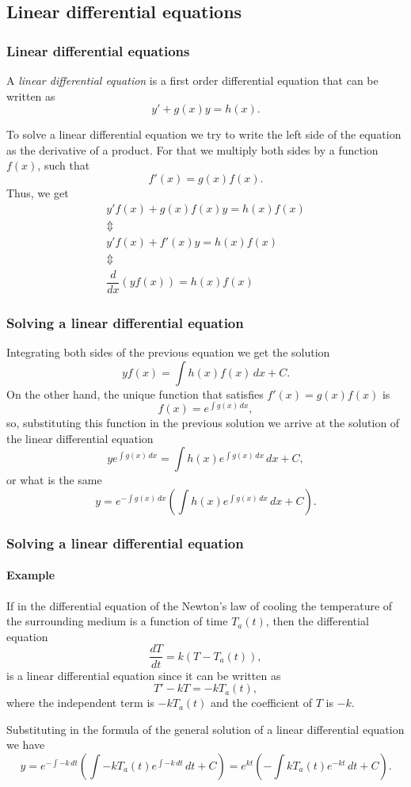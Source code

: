 \subsection{Linear differential equations}
\begin{frame}
\frametitle{Linear differential equations}
\begin{definition}
A \emph{linear differential equation} is a first order differential equation that can be written as
\[y'+g(x)y = h(x).\]
\end{definition}

To solve a linear differential equation we try to write the left side of the equation as the derivative of a product. 
For that we multiply both sides by a function $f(x)$, such that
\[f'(x)=g(x)f(x).\]
Thus, we get
\[
\begin{array}{c}
y'f(x)+g(x)f(x)y=h(x)f(x)\\
\Updownarrow\\
y'f(x)+f'(x)y=h(x)f(x)\\
\Updownarrow\\
\dfrac{d}{dx}(yf(x))=h(x)f(x)
\end{array}
\]
\end{frame}


\begin{frame}
\frametitle{Solving a linear differential equation}
Integrating both sides of the previous equation we get the solution
\[
yf(x)=\int h(x)f(x)\,dx+C.
\]
On the other hand, the unique function that satisfies $f'(x)=g(x)f(x)$ is
\[
f(x)=e^{\int g(x)\,dx},
\]
so, substituting this function in the previous solution we arrive at the solution of the linear differential equation
\[
ye^{\int g(x)\,dx}=\int h(x) e^{\int g(x)\,dx}\,dx+C,
\]
or what is the same
\[
y=e^{-\int g(x)\,dx}\left(\int h(x)e^{\int g(x)\,dx}\,dx+C\right).
\]
\end{frame}


\begin{frame}
\frametitle{Solving a linear differential equation}
\framesubtitle{Example}
If in the differential equation of the Newton's law of cooling the temperature of the surrounding medium is a function of time $T_a(t)$, then the differential equation 
\[
\frac{dT}{dt}=k(T-T_a(t)),
\]
is a linear differential equation since it can be written as
\[
T'-kT=-kT_a(t),
\]
where the independent term is $-kT_a(t)$ and the coefficient of $T$ is $-k$.

Substituting in the formula of the general solution of a linear differential equation we have
\[
y=e^{-\int -k\,dt}\left(\int -kT_a(t)e^{\int -k\,dt}\,dt+C\right)=
e^{kt}\left(-\int kT_a(t)e^{-kt}\,dt+C\right).
\]
\end{frame}


